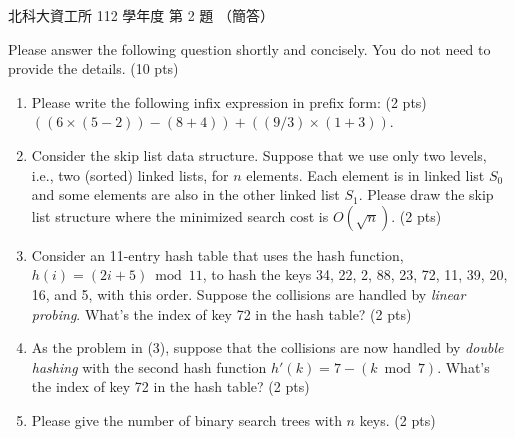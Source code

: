 \begin{pastexam}[label={px:ntut-112-ci-02}]{北科大資工所 112 學年度 第 2 題}
（簡答）

Please answer the following question shortly and concisely. You do not need to provide the details. (10 pts)
\begin{enumerate}[label=(\arabic*)]
\item Please write the following infix expression in prefix form: (2 pts)\\
$((6\times(5-2))-(8+4))+((9/3)\times(1+3))$.
\item Consider the skip list data structure. Suppose that we use only two levels, i.e., two (sorted) linked lists, for $n$ elements. Each element is in linked list $S_0$ and some elements are also in the other linked list $S_1$. Please draw the skip list structure where the minimized search cost is $O(\sqrt{n})$. (2 pts)
\item Consider an 11-entry hash table that uses the hash function, $h(i)=(2i+5)\bmod 11$, to hash the keys 34, 22, 2, 88, 23, 72, 11, 39, 20, 16, and 5, with this order. Suppose the collisions are handled by \textit{linear probing}. What's the index of key 72 in the hash table? (2 pts)
\item As the problem in (3), suppose that the collisions are now handled by \textit{double hashing} with the second hash function $h'(k)=7-(k\bmod 7)$. What's the index of key 72 in the hash table? (2 pts)
\item Please give the number of binary search trees with $n$ keys. (2 pts)
\end{enumerate}
\end{pastexam}

